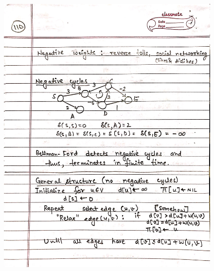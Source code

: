 \begin{figure}[H]
    \centering
    \includegraphics[scale=0.25]{"./MIT 6.006/MIT_6006_110"}
\end{figure}
\newpage
